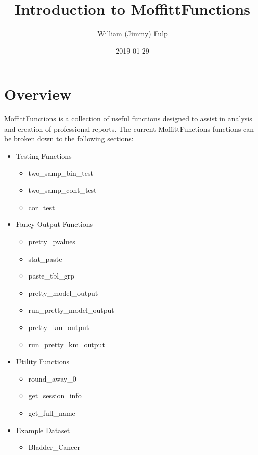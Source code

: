 \documentclass[table]{article}
\title{Introduction to MoffittFunctions}
\author{William (Jimmy) Fulp}
\date{2019-01-29}
\providecommand{\tightlist}{%
  \setlength{\itemsep}{0pt}\setlength{\parskip}{0pt}}
\begin{document}
\maketitle

{
\setcounter{tocdepth}{2}
\tableofcontents
}
\listoftables

\clearpage

\hypertarget{overview}{%
\section{Overview}\label{overview}}

MoffittFunctions is a collection of useful functions designed to assist
in analysis and creation of professional reports. The current
MoffittFunctions functions can be broken down to the following sections:

\begin{itemize}
\tightlist
\item
  Testing Functions

  \begin{itemize}
  \tightlist
  \item
    two\_samp\_bin\_test
  \item
    two\_samp\_cont\_test
  \item
    cor\_test
  \end{itemize}
\item
  Fancy Output Functions

  \begin{itemize}
  \tightlist
  \item
    pretty\_pvalues
  \item
    stat\_paste
  \item
    paste\_tbl\_grp
  \item
    pretty\_model\_output
  \item
    run\_pretty\_model\_output
  \item
    pretty\_km\_output
  \item
    run\_pretty\_km\_output
  \end{itemize}
\item
  Utility Functions

  \begin{itemize}
  \tightlist
  \item
    round\_away\_0
  \item
    get\_session\_info
  \item
    get\_full\_name
  \end{itemize}
\item
  Example Dataset

  \begin{itemize}
  \tightlist
  \item
    Bladder\_Cancer
  \end{itemize}
\end{itemize}
\end{document}
